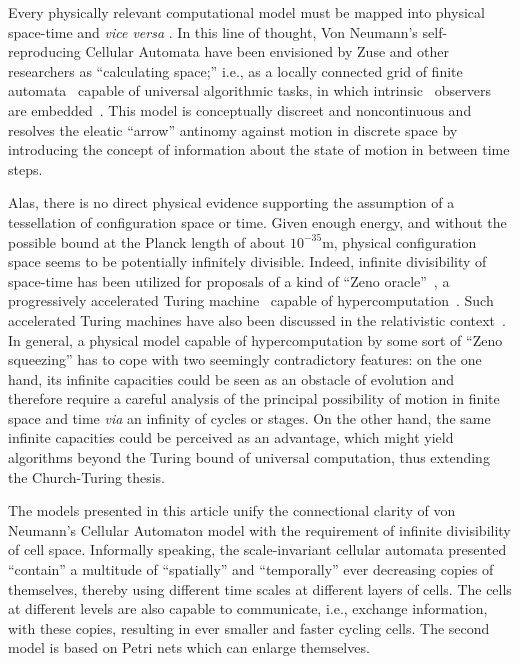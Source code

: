 \documentclass[pre,showpacs,showkeys,preprint]{revtex4}
\theoremstyle{definition}
\begin{document}
Every physically relevant computational model must be mapped into physical space-time and {\it vice versa}
\cite{landauer-89,maxwell-demon,bennett-73}.
In this line of thought, Von Neumann's self-reproducing Cellular Automata \cite{v-neumann-66}
have been envisioned by Zuse \cite{zuse-69}
and other researchers  \cite{fredkin,toffoli-margolus-90,wolfram-2002,Margenstern:jucs_5_9:a_polynomial_solution_for}
as  ``calculating space;''
i.e., as a  locally connected grid of finite automata~\cite{hopcroft}
capable of universal algorithmic tasks, in which
intrinsic~\cite{svozil-94} observers are embedded~\cite{toffoli:79}.
This model is conceptually discreet and
noncontinuous and resolves the eleatic ``arrow''
antinomy \cite{zeno,ki-57,gruenbaum:68,salmon-01}
against motion in discrete space by introducing
the concept of information about the state of motion in between time steps.

Alas,  there is no direct physical evidence supporting  the assumption of a tessellation of configuration space or time.
Given enough energy, and without the possible bound at the Planck length of about $10^{-35}$m, physical configuration space seems
to be potentially infinitely divisible.
Indeed, infinite divisibility of space-time has been utilized for proposals of a kind of ``Zeno oracle''~\cite{weyl:49},
a progressively accelerated Turing machine~\cite{gruenbaum:74,Davies01,ord-2006}
capable of hypercomputation~\cite{Davis-2004,Doria-2006,Davis-2006}.
Such accelerated Turing machines have also been discussed in the relativistic context~\cite{DBLP:conf/mcu/Durand-Lose04,Nemeti2006118}.
In general, a physical model capable of hypercomputation by some sort of ``Zeno squeezing'' has to cope with two seemingly contradictory
features: on the one hand, its infinite capacities could be seen as an obstacle of evolution and therefore
require a careful analysis of the principal possibility of motion in finite space and time
{\it via} an infinity of cycles or stages.
On the other hand, the same infinite capacities could be perceived as an advantage, which
might yield algorithms beyond the Turing bound of universal computation, thus extending the Church-Turing thesis.



The models presented in this article unify the connectional clarity of
von Neumann's Cellular Automaton model with the requirement of infinite divisibility of cell space.
Informally speaking,
the scale-invariant cellular automata presented ``contain''  a multitude of ``spatially'' and ``temporally'' ever decreasing copies of themselves,
thereby using different time scales at different layers of cells.
The cells at different levels are also capable to communicate, i.e., exchange information, with these copies, resulting in ever smaller and faster cycling cells.
The second model is based on Petri nets which can enlarge themselves.
\end{document}
